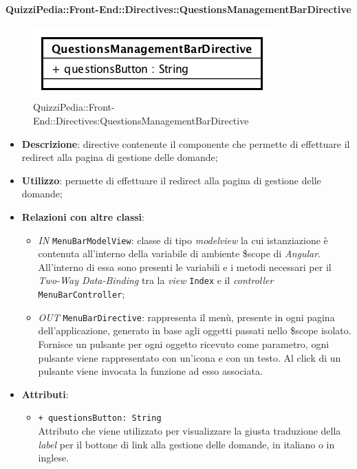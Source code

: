 \paragraph[QuizziPedia::Front-End::Directives\\::QuestionsManagementBarDirective]{QuizziPedia::Front-End::Directives::QuestionsManagementBarDirective}

\label{QuizziPedia::Front-End::Directives::QuestionsManagementBarDirective}
\begin{figure} [ht]
	\centering
	\includegraphics[scale=0.80]{UML/Classi/Front-End/QuizziPedia_Front-end_Directives_QuestionsManagementBarDirective.png}
	\caption{QuizziPedia::Front-End::Directives:QuestionsManagementBarDirective}
\end{figure} \FloatBarrier
\begin{itemize}
	\item \textbf{Descrizione}: directive contenente il componente che permette di effettuare il redirect alla pagina di gestione delle domande;
	\item \textbf{Utilizzo}: permette di effettuare il redirect alla pagina di gestione delle domande;
	\item \textbf{Relazioni con altre classi}:
	\begin{itemize}
		\item \textit{IN} \texttt{MenuBarModelView}: classe di tipo \textit{modelview} la cui istanziazione è contenuta all'interno della variabile di ambiente \$scope di \textit{Angular}. All'interno di essa sono presenti le variabili e i metodi necessari per il \textit{Two-Way Data-Binding} tra la \textit{view} \texttt{Index} e il \textit{controller} \texttt{MenuBarController};
		\item \textit{OUT} \texttt{MenuBarDirective}: rappresenta il menù, presente in ogni pagina dell'applicazione, generato in base agli oggetti passati nello \$scope isolato. Fornisce un pulsante per ogni oggetto ricevuto come parametro, ogni pulsante viene rappresentato con un’icona e con un testo. Al click di un pulsante viene invocata la funzione ad esso associata.  
	\end{itemize}
	\item \textbf{Attributi}:
	\begin{itemize}
		\item \texttt{+ questionsButton: String} \\ Attributo che viene utilizzato per visualizzare la giusta traduzione della \textit{label} per il bottone di link alla gestione delle domande, in italiano o in inglese.
	\end{itemize}
\end{itemize}